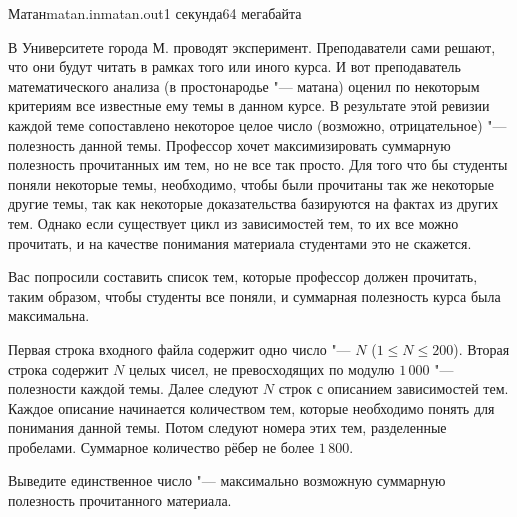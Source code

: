 

\begin{problem}{Матан}{matan.in}{matan.out}{1 секунда}{64 мегабайта}

В Университете города М. проводят эксперимент. Преподаватели сами решают, что они будут читать в рамках того или иного курса.
И вот преподаватель математического анализа (в простонародье "--- матана) оценил по некоторым критериям все известные ему темы в данном курсе.
В результате этой ревизии каждой теме сопоставлено некоторое целое число (возможно, отрицательное) "--- полезность данной темы.
Профессор хочет максимизировать суммарную полезность прочитанных им тем, но не все так просто. Для того что бы студенты поняли некоторые темы, необходимо, 
чтобы были прочитаны так же некоторые другие темы, так как некоторые доказательства базируются на фактах из других тем.
Однако если существует цикл из зависимостей тем, то их все можно прочитать, и на качестве понимания материала студентами
это не скажется.

Вас попросили составить список 
тем, которые профессор должен прочитать, таким образом, чтобы студенты все поняли, и 
суммарная полезность курса была максимальна. 

\InputFile

Первая строка входного файла содержит одно число "--- $N$ ($1 \le N \le 200$).
Вторая строка содержит $N$ целых чисел, не превосходящих по модулю $1\,000$ "--- полезности каждой темы.
Далее следуют $N$ строк с описанием зависимостей тем.
Каждое описание начинается количеством тем, которые необходимо понять для понимания данной темы. Потом следуют номера этих тем, разделенные пробелами.
Суммарное количество рёбер не более $1\,800$.

\OutputFile

Выведите единственное число "--- максимально возможную суммарную полезность прочитанного материала.

\Examples

\begin{example}%
%
%
\end{example}

\end{problem}
